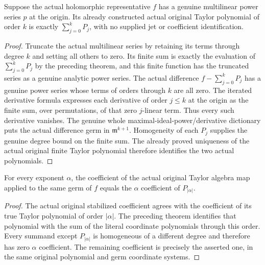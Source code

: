 \begin{theorem}
\label{hir:actual-multilinear-finite-jet-dictionary}
\leanok
Suppose the actual holomorphic representative $f$ has a genuine multilinear power series $p$ at the origin. Its already constructed actual original Taylor polynomial of order $k$ is exactly $\sum_{j=0}^k P_j$, with no supplied jet or coefficient identification.
\end{theorem}
\begin{proof}
Truncate the actual multilinear series by retaining its terms through degree $k$ and setting all others to zero. Its finite sum is exactly the evaluation of $\sum_{j=0}^kP_j$ by the preceding theorem, and this finite function has the truncated series as a genuine analytic power series. The actual difference $f-\sum_{j=0}^kP_j$ has a genuine power series whose terms of orders through $k$ are all zero. The iterated derivative formula expresses each derivative of order $j\le k$ at the origin as the finite sum, over permutations, of that zero $j$-linear term. Thus every such derivative vanishes. The genuine whole maximal-ideal-power/derivative dictionary puts the actual difference germ in $\mathfrak m^{k+1}$. Homogeneity of each $P_j$ supplies the genuine degree bound on the finite sum. The already proved uniqueness of the actual original finite Taylor polynomial therefore identifies the two actual polynomials.
\end{proof}

\begin{theorem}
\label{hir:actual-original-taylor-multilinear-coefficient}
\leanok
For every exponent $\alpha$, the coefficient of the actual original Taylor algebra map applied to the same germ of $f$ equals the $\alpha$ coefficient of $P_{|\alpha|}$.
\end{theorem}
\begin{proof}
The actual original stabilized coefficient agrees with the coefficient of its true Taylor polynomial of order $|\alpha|$. The preceding theorem identifies that polynomial with the sum of the literal coordinate polynomials through this order. Every summand except $P_{|\alpha|}$ is homogeneous of a different degree and therefore has zero $\alpha$ coefficient. The remaining coefficient is precisely the asserted one, in the same original polynomial and germ coordinate systems.
\end{proof}

